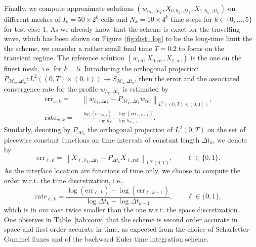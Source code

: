 \documentclass{amsart}
\newcommand\dt{\Delta t}
\newcommand\Mm{{\mathcal M}}
\begin{document}
Finally, we compute approximate solutions $(w_{h_k, \dt_k}, X_{0,h_k, \dt_k}, X_{1,h_k, \dt_k})$ on different meshes of $I_k = 50 \times 2^k$ cells and $N_k = 10 \times 4^k$ time steps for $k \in \{0,\dots, 5\}$ for test-case 1. As we already know that the scheme is exact for the travelling wave, which has been shown on Figure~\ref{fig:dist_log} to be the long-time limit the the scheme, we consider a rather small final time $T = 0.2$ to focus on the transient regime. 
The reference solution $(w_\text{ref}, X_{0,\text{ref}}, X_{1,\text{ref}})$ is the one on the finest mesh, i.e. for $k=5$.
Introducing the orthogonal projection  $P_{\Mm_k, \dt_k}: L^2((0,T) \times (0,1)) \to S_{\Mm_k, \dt_k}$, then the error and the associated convergence rate for the profile $w_{h_k, \dt_k}$ is estimated by 
\begin{align*}
\text{err}_{w,k} =\;& \left\|w_{h_k, \dt_k} - P_{\Mm_k, \dt_k} w_\text{ref}\right\|_{L^2((0,T)\times (0,1))},
\\
\text{rate}_{w,k} =\;& \frac{\log(\text{err}_{w,k}) - \log(\text{err}_{w,k-1})}{\log h_k - \log h_{k-1}}.
\end{align*}
Similarly, denoting by $P_{\dt_k}$ the orthogonal projection of $L^2(0,T)$ on the set of piecewise constant functions on time intervals of constant length $\dt_k$, 
we denote by 
\[\text{err}_{\ell,k} = \left\|X_{\ell, h_k, \dt_k} - P_{\dt_k} X_{\ell,\text{ref}} \right\|_{L^\infty(0,T)}, 
\qquad \ell \in \{0,1\}.\]
As the interface location are functions of time only, we choose to compute the order w.r.t. the time discretization, i.e.,  
\[
\text{rate}_{\ell,k} = \frac{\log(\text{err}_{\ell,k}) - \log(\text{err}_{\ell,k-1})}{\log \dt_k - \log \dt_{k-1}}, 
\qquad \ell \in \{0,1\}, 
\]
which is in our case twice smaller than the one w.r.t. the space discretization.
One observes in Table~\ref{tab:conv} that the scheme is second order accurate in space and 
first order accurate in time, as expected from the choice of Scharfetter-Gummel fluxes and of the 
backward Euler time integration scheme. 
\end{document}
